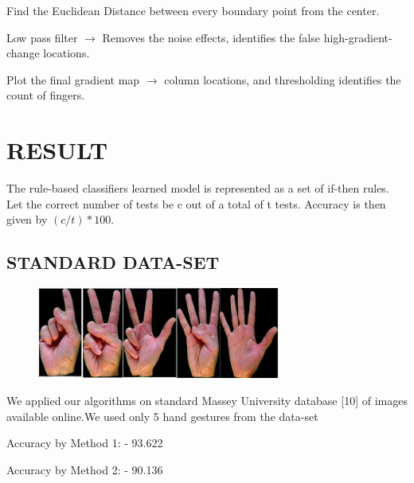 \documentclass[conference]{IEEEtran}
\begin{document}
Find the Euclidean Distance between every boundary point from the center.

Low pass filter $\rightarrow$ Removes the noise effects, identifies the false high-gradient-change locations.

Plot the final gradient map $\rightarrow$ column locations, and thresholding identifies the count of fingers.

\section{RESULT}
The rule-based classifiers learned model is represented as a set of if-then rules. Let the correct number of tests be c out of a total of t tests.
Accuracy is then given by $(c/t)*100$.

\subsection{STANDARD DATA-SET}
\begin{figure}[h!]
	\centering
	\includegraphics[width = 8cm, height = 3cm]{StandardDataset1}
\end{figure}
We applied our algorithms on standard Massey University database [10] of images available online.We used only 5 hand gestures from the data-set

Accuracy by Method 1: - 93.622%

Accuracy by Method 2: - 90.136%
%
%
\end{document}
